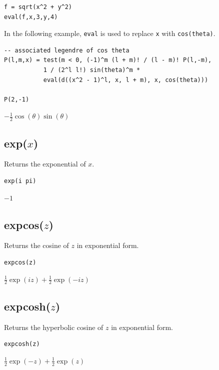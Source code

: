 \documentclass[12pt]{article}
\begin{document}
{\color{blue}
\begin{verbatim}
f = sqrt(x^2 + y^2)
eval(f,x,3,y,4)
\end{verbatim}
}


\bigskip
\noindent
In the following example, \verb$eval$ is used to replace
\verb$x$ with \verb$cos(theta)$.

{\color{blue}
\begin{verbatim}
-- associated legendre of cos theta
P(l,m,x) = test(m < 0, (-1)^m (l + m)! / (l - m)! P(l,-m),
           1 / (2^l l!) sin(theta)^m *
           eval(d((x^2 - 1)^l, x, l + m), x, cos(theta)))

P(2,-1)
\end{verbatim}
}

$\displaystyle
-\tfrac{1}{2}\cos(\theta)\sin(\theta)
$

\subsection*{exp($x$)}

Returns the exponential of $x$.

{\color{blue}
\begin{verbatim}
exp(i pi)
\end{verbatim}
}

\noindent
$-1$

\subsection*{expcos($z$)}

Returns the cosine of $z$ in exponential form.

{\color{blue}
\begin{verbatim}
expcos(z)
\end{verbatim}
}

\noindent
$\displaystyle \tfrac{1}{2}\exp(iz)+\tfrac{1}{2}\exp(-iz)$

\subsection*{expcosh($z$)}

Returns the hyperbolic cosine of $z$ in exponential form.

{\color{blue}
\begin{verbatim}
expcosh(z)
\end{verbatim}
}

\noindent
$\displaystyle \tfrac{1}{2}\exp(-z)+\tfrac{1}{2}\exp(z)$
\end{document}
